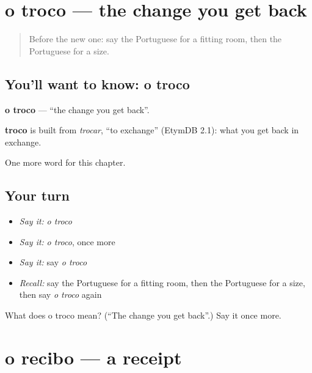 \section[o troco]{o troco — the change you get back}

\label{lesson:PT-C253-troco}



\begin{quote}
Before the new one: say the Portuguese for a fitting room, then the Portuguese for a size.
\end{quote}

\subsection*{You'll want to know: o troco}
\textbf{o troco} — \textquotedblleft{}the change you get back\textquotedblright{}.

\begin{cousinweb}
\textbf{troco} is built from \emph{trocar}, \textquotedblleft{}to exchange\textquotedblright{} (EtymDB 2.1): what you get back in exchange.
\end{cousinweb}

\begin{grammarlens}[title={What you've built}]
One more word for this chapter.
\end{grammarlens}

\subsection*{Your turn}
\begin{itemize}
\raggedright
  \item \emph{Say it:} \emph{o troco}
  \item \emph{Say it:} \emph{o troco}, once more
  \item \emph{Say it:} say \emph{o troco}
  \item \emph{Recall:} say the Portuguese for a fitting room, then the Portuguese for a size, then say \emph{o troco} again
\end{itemize}

\begin{tcolorbox}[breakable,colback=teal!4,colframe=teal!35!black,title={Before you move on}]
What does o troco mean? (\textquotedblleft{}The change you get back\textquotedblright{}.) Say it once more.
\end{tcolorbox}
\section[o recibo]{o recibo — a receipt}

